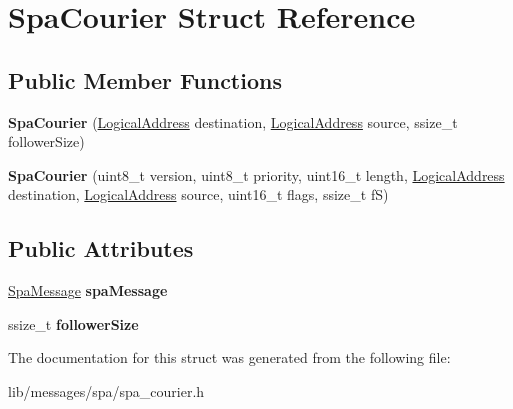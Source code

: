 \hypertarget{structSpaCourier}{}\section{Spa\+Courier Struct Reference}
\label{structSpaCourier}
\subsection*{Public Member Functions}
\begin{DoxyCompactItemize}
\item 
\mbox{\label{structSpaCourier_a79c58c501a8b0f5dbde22e7d3f526db2}} 
{\bfseries Spa\+Courier} (\hyperlink{structLogicalAddress}{Logical\+Address} destination, \hyperlink{structLogicalAddress}{Logical\+Address} source, ssize\+\_\+t follower\+Size)
\item 
\mbox{\label{structSpaCourier_ac773f210ab350c0e8557c67cbc1b3971}} 
{\bfseries Spa\+Courier} (uint8\+\_\+t version, uint8\+\_\+t priority, uint16\+\_\+t length, \hyperlink{structLogicalAddress}{Logical\+Address} destination, \hyperlink{structLogicalAddress}{Logical\+Address} source, uint16\+\_\+t flags, ssize\+\_\+t fS)
\end{DoxyCompactItemize}
\subsection*{Public Attributes}
\begin{DoxyCompactItemize}
\item 
\mbox{\label{structSpaCourier_a6121a451925b18b20a5ee30669fcf46c}} 
\hyperlink{structSpaMessage}{Spa\+Message} {\bfseries spa\+Message}
\item 
\mbox{\label{structSpaCourier_a0a96d2328c68554838cc1e736181dfd1}} 
ssize\+\_\+t {\bfseries follower\+Size}
\end{DoxyCompactItemize}


The documentation for this struct was generated from the following file\+:\begin{DoxyCompactItemize}
\item 
lib/messages/spa/spa\+\_\+courier.\+h\end{DoxyCompactItemize}
